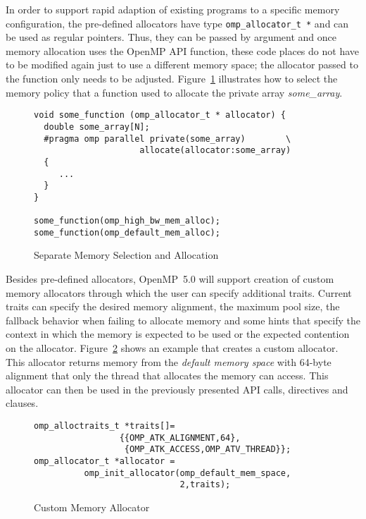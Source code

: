 In order to support rapid adaption of existing programs to a specific memory 
configuration, the pre-defined allocators have type 
\texttt{omp\_allocator\_t *} and can be used as regular pointers. Thus, they 
can be passed by argument and once memory allocation uses the OpenMP API 
function, these code places do not have to be modified again just to use a 
different memory space; the allocator passed to the function only needs to 
be adjusted. Figure~\ref{fig:separation-concerns-alloc} illustrates how to
select the memory policy that a function used to allocate the private array 
\emph{some\_array}.


\begin{figure}[t]
\begin{verbatim}
void some_function (omp_allocator_t * allocator) {
  double some_array[N];
  #pragma omp parallel private(some_array)        \
                     allocate(allocator:some_array)
  {
     ...
  }
}

some_function(omp_high_bw_mem_alloc);
some_function(omp_default_mem_alloc);
\end{verbatim}
\caption{Separate Memory Selection and Allocation\label{fig:separation-concerns-alloc}}
\end{figure}

Besides pre-defined allocators, OpenMP~5.0 will support creation of custom 
memory allocators through which the user can specify additional traits.
Current traits can specify the desired memory alignment, 
the maximum pool size, the fallback behavior when failing to allocate memory 
and some hints that specify the context in which the memory is expected to be
used or the expected contention on the allocator. 
Figure~\ref{fig:custom-allocator} shows an example that creates a custom 
allocator. This allocator returns memory from the \emph{default memory space} 
with 64-byte alignment that only the thread that allocates the memory can 
access. This allocator can then be used in the previously presented API calls, 
directives and clauses.

\begin{figure}[t]
\begin{verbatim}
omp_alloctraits_t *traits[]=
                 {{OMP_ATK_ALIGNMENT,64},
                  {OMP_ATK_ACCESS,OMP_ATV_THREAD}};
omp_allocator_t *allocator = 
          omp_init_allocator(omp_default_mem_space,
                             2,traits);
\end{verbatim}
\caption{Custom Memory Allocator\label{fig:custom-allocator}}
\end{figure}


